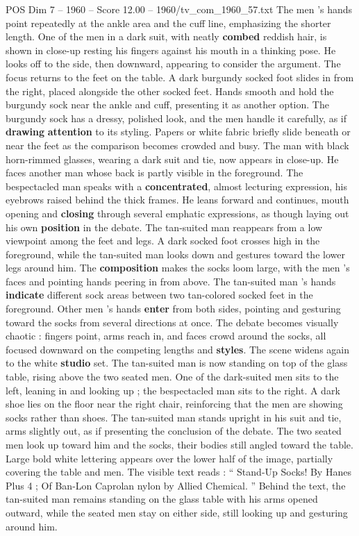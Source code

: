 \begin{textsample}{POS Dim 7 – 1960 – Score 12.00 – 1960/tv\_com\_1960\_57.txt}
The men ’s hands point repeatedly at the ankle area and the cuff line, emphasizing the shorter length.
One of the men in a dark suit, with neatly \textbf{combed} reddish hair, is shown in close-up resting his fingers against his mouth in a thinking pose.
He looks off to the side, then downward, appearing to consider the argument.
The focus returns to the feet on the table.
A dark burgundy socked foot slides in from the right, placed alongside the other socked feet.
Hands smooth and hold the burgundy sock near the ankle and cuff, presenting it as another option.
The burgundy sock has a dressy, polished look, and the men handle it carefully, as if \textbf{drawing} \textbf{attention} to its styling.
Papers or white fabric briefly slide beneath or near the feet as the comparison becomes crowded and busy.
The man with black horn-rimmed glasses, wearing a dark suit and tie, now appears in close-up.
He faces another man whose back is partly visible in the foreground.
The bespectacled man speaks with a \textbf{concentrated}, almost lecturing expression, his eyebrows raised behind the thick frames.
He leans forward and continues, mouth opening and \textbf{closing} through several emphatic expressions, as though laying out his own \textbf{position} in the debate.
The tan-suited man reappears from a low viewpoint among the feet and legs.
A dark socked foot crosses high in the foreground, while the tan-suited man looks down and gestures toward the lower legs around him.
The \textbf{composition} makes the socks loom large, with the men ’s faces and pointing hands peering in from above.
The tan-suited man ’s hands \textbf{indicate} different sock areas between two tan-colored socked feet in the foreground.
Other men ’s hands \textbf{enter} from both sides, pointing and gesturing toward the socks from several directions at once.
The debate becomes visually chaotic : fingers point, arms reach in, and faces crowd around the socks, all focused downward on the competing lengths and \textbf{styles}.
The scene widens again to the white \textbf{studio} set.
The tan-suited man is now standing on top of the glass table, rising above the two seated men.
One of the dark-suited men sits to the left, leaning in and looking up ; the bespectacled man sits to the right.
A dark shoe lies on the floor near the right chair, reinforcing that the men are showing socks rather than shoes.
The tan-suited man stands upright in his suit and tie, arms slightly out, as if presenting the conclusion of the debate.
The two seated men look up toward him and the socks, their bodies still angled toward the table.
Large bold white lettering appears over the lower half of the image, partially covering the table and men.
The visible text reads : “ Stand-Up Socks!
By Hanes Plus 4 ; Of Ban-Lon Caprolan nylon by Allied Chemical. ” Behind the text, the tan-suited man remains standing on the glass table with his arms opened outward, while the seated men stay on either side, still looking up and gesturing around him.

\end{textsample}
